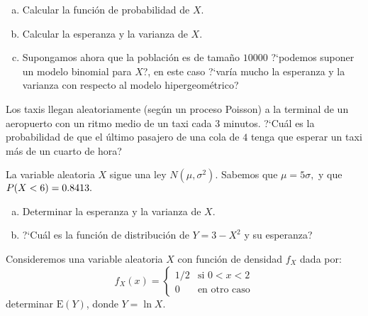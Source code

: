 \documentclass[12pt]{article}
\begin{document}
\begin{enumerate}[a)]
\item Calcular la función de probabilidad de $X$.
\item Calcular la esperanza y la varianza de $X$.
\item Supongamos ahora que la población es de tamaño $10000$ ?`podemos suponer un modelo
binomial para $X$?, en este caso ?`varía mucho la esperanza y la varianza con respecto al
modelo hipergeométrico?
\end{enumerate}




\probl  Los taxis llegan aleatoriamente (según un proceso Poisson) a la terminal de un
aeropuerto con un ritmo medio de un taxi cada $3$ minutos. ?`Cuál es la probabilidad de que
el último pasajero de una cola de $4$ tenga que esperar un taxi más de un cuarto de hora?





\probl  La variable aleatoria $X$ sigue una ley  $\displaystyle N(\mu, \sigma^2). $ Sabemos
que   $ \mu = 5  \sigma,
 $ y  que $ P(X < 6) = 0.8413.$

\begin{enumerate}[a)]
\item Determinar la esperanza y la varianza de $X$.
\item ?`Cuál es la función de distribución de $ Y = 3
- X^2  $ y su esperanza? 
\end{enumerate}





\probl  Consideremos una variable aleatoria $X$ con función de densidad $f_X$ dada por:
$$f_X(x) = \left\{\begin{array}{ll}
1/2 & \mbox{si }  0<x<2\\ 0 & \mbox{en otro caso}\end{array}\right.$$
 determinar
$\mathrm{E}( Y)$, donde $Y= \ln X.$ 
\end{document}
